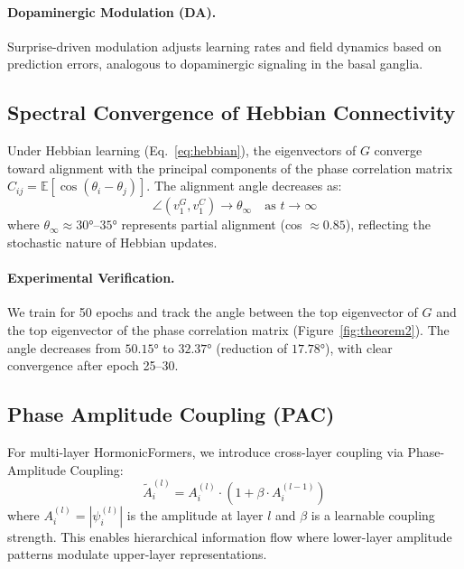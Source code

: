 \paragraph{Dopaminergic Modulation (DA).}
Surprise-driven modulation adjusts learning rates and field dynamics based on prediction errors, analogous to dopaminergic signaling in the basal ganglia.

\subsection{Spectral Convergence of Hebbian Connectivity}

\begin{theorem}
\label{thm:spectral-convergence}
Under Hebbian learning (Eq.~\eqref{eq:hebbian}), the eigenvectors of $G$ converge toward alignment with the principal components of the phase correlation matrix $C_{ij} = \mathbb{E}[\cos(\theta_i - \theta_j)]$. The alignment angle decreases as:
\begin{equation}
\angle(v_1^G, v_1^C) \to \theta_{\infty} \quad \text{as } t \to \infty
\end{equation}
where $\theta_{\infty} \approx 30°$--$35°$ represents partial alignment (cos $\approx 0.85$), reflecting the stochastic nature of Hebbian updates.
\end{theorem}

\paragraph{Experimental Verification.}
We train for 50 epochs and track the angle between the top eigenvector of $G$ and the top eigenvector of the phase correlation matrix (Figure~\ref{fig:theorem2}). The angle decreases from $50.15°$ to $32.37°$ (reduction of $17.78°$), with clear convergence after epoch 25--30.

\subsection{Phase Amplitude Coupling (PAC)}

For multi-layer HormonicFormers, we introduce cross-layer coupling via Phase-Amplitude Coupling:
\begin{equation}
\tilde{A}_i^{(l)} = A_i^{(l)} \cdot \left(1 + \beta \cdot A_i^{(l-1)}\right)
\end{equation}
where $A_i^{(l)} = |\psi_i^{(l)}|$ is the amplitude at layer $l$ and $\beta$ is a learnable coupling strength. This enables hierarchical information flow where lower-layer amplitude patterns modulate upper-layer representations.

